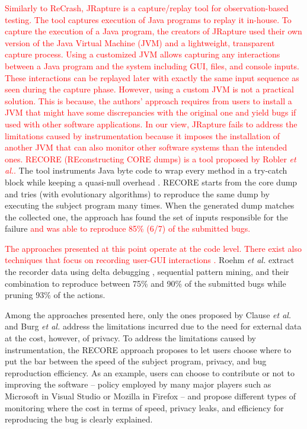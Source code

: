 \documentclass[times, doublespace]{smrauth}
\newcommand{\red}[1]{\textcolor{red}{#1}}
\begin{document}
\red{Similarly to ReCrash, JRapture \cite{Steven2000} is a capture/replay tool for observation-based testing. The tool captures execution of Java programs to replay it in-house. To capture the execution of a Java program, the creators of JRapture used their own version of the Java Virtual Machine (JVM) and a lightweight, transparent capture process.
Using a customized JVM allows capturing any interactions between a Java program and the system including GUI, files, and console inputs.
These interactions can be replayed later  with exactly the same input sequence as seen during the capture phase.
However, using a custom JVM is not a practical solution. This is because, the authors' approach requires from users to install a JVM that might have some discrepancies with the original one and yield bugs if used with other software applications.
In our view,  JRapture fails to address the limitations caused
by instrumentation because it imposes the installation of another
JVM that can also monitor other software systems than the intended ones.
RECORE (REconstructing CORE dumps) is a tool proposed by Robler {\it et al.}.} The tool instruments Java byte code to wrap every method in a try-catch block while keeping a quasi-null overhead \cite{Rossler2013}. RECORE starts from the core dump and tries (with evolutionary algorithms) to reproduce the same dump by executing the subject program many times. When the generated dump matches the collected one, the approach has found the set of inputs responsible for the failure \red{and was able to reproduce 85\% (6/7) of the submitted bugs.}

\red{The approaches presented at this point operate at the code level.
There exist also techniques that focus on recording user-GUI interactions \cite{Herbold2011,Roehm2015}.}
Roehm {\it et al.} extract the recorder data using delta debugging \cite{Zeller2002}, sequential pattern mining, and their combination to reproduce between 75\% and 90\% of the submitted bugs while pruning 93\% of the actions.

Among the approaches presented here, only the ones proposed by Clause {\it et al.} and Burg {\it et al.} address the limitations incurred due to the need for external data  at the cost, however, of privacy. To address the limitations caused by instrumentation,  the RECORE approach proposes to let users choose where to put the bar between the speed of the subject program, privacy, and bug reproduction efficiency. As an example, users can choose to contribute or not to improving the software -- policy employed by many major players such as Microsoft in Visual Studio or Mozilla in Firefox -- and propose different types of monitoring where the cost in terms of speed, privacy leaks, and efficiency for reproducing the bug is clearly explained.
\end{document}
